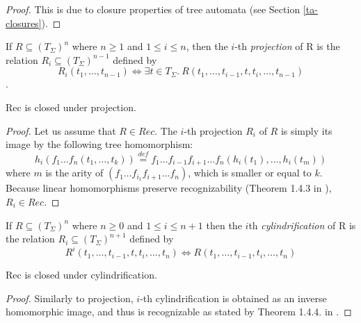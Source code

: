 \begin{proof}
This is due to closure properties of tree automata (see Section
\ref{ta-closures}).
\end{proof}

\begin{defz}
If $R \subseteq (T_\Sigma)^n$ where $n \geq 1$ and $1 \leq i \leq n$, then the
$i$-th \emph{projection} of R is the relation $R_i \subseteq (T_\Sigma)^{n-1}$
defined by 
\begin{equation}
 R_i(t_1,\ldots,t_{n-1}) \Leftrightarrow \exists t \in T_\Sigma
.\ R(t_1,\ldots,t_{i-1},t,t_i,\ldots,t_{n-1})
\end{equation}.
\end{defz}

\begin{lemma}
Rec is closed under projection.
\end{lemma}

\begin{proof}
 Let us assume that $R \in Rec$. The $i$-th projection $R_i$ of $R$ is simply
 its image by the following tree homomorphism:
 \begin{equation}
 h_i(f_1\ldots f_n (t_1,\ldots,t_k)) \overset{\mathit{def}}{=} f_1\ldots f_{i-1}f_{i+1}\ldots f_n(h_i(t_1),\ldots,h_i(t_m))
\end{equation}
where $m$ is the arity of $(f_1\ldots f_{i_1}f_{i+1}\ldots f_n)$, which is
smaller or equal to $k$. Because linear homomorphisms preserve recognizability
(Theorem 1.4.3 in \cite{tata}), $R_i \in Rec$.
\end{proof}

\begin{defz}
 If $R \subseteq (T_\Sigma)^n$ where $n \geq 0$ and $1 \leq i \leq n+1$ then the
 $i$th \emph{cylindrification} of R is the relation $R_i \subseteq
 (T_\Sigma)^{n+1}$ defined by 
\begin{equation}
 R^i(t_1,\ldots,t_{i-1},t,t_i,\ldots,t_n)
 \Leftrightarrow R(t_1,\ldots,t_{i-1},t_i,\ldots,t_n)
\end{equation}
\end{defz}

\begin{lemma}
Rec is closed under cylindrification.
\end{lemma}

\begin{proof}
 Similarly to projection, $i$-th cylindrification is obtained as an inverse
 homomorphic image, and thus is recognizable as stated by Theorem 1.4.4. in
 \cite{tata}.
\end{proof}

